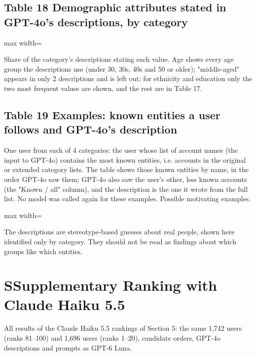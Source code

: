 \documentclass[10pt]{article}
\begin{document}
\subsection*{Table 18 \textperiodcentered{} Demographic attributes stated in GPT-4o's descriptions, by category}
\begin{center}\begin{adjustbox}{max width=\linewidth}

\end{adjustbox}\end{center}

{\small Share of the category's descriptions stating each value. Age shows every age group the descriptions use (under 30, 30s, 40s and 50 or older); "middle-aged" appears in only 2 descriptions and is left out; for ethnicity and education only the two most frequent values are shown, and the rest are in Table 17.}

\subsection*{Table 19 \textperiodcentered{} Examples: known entities a user follows and GPT-4o's description}
One user from each of 4 categories: the user whose list of account names (the input to GPT-4o) contains the most known entities, i.e. accounts in the original or extended category lists. The table shows those known entities by name, in the order GPT-4o saw them; GPT-4o also saw the user's other, less known accounts (the "Known / all" column), and the description is the one it wrote from the full list. No model was called again for these examples. Possible motivating examples.

\begin{center}\begin{adjustbox}{max width=\linewidth}

\end{adjustbox}\end{center}

{\small The descriptions are stereotype-based guesses about real people, shown here identified only by category. They should not be read as findings about which groups like which entities.}

\section*{S\quad Supplementary \textperiodcentered{} Ranking with Claude Haiku 5.5}
All results of the Claude Haiku 5.5 rankings of Section 5: the same 1,742 users (ranks 81--100) and 1,696 users (ranks 1--20), candidate orders, GPT-4o descriptions and prompts as GPT-6 Luna.
\end{document}
